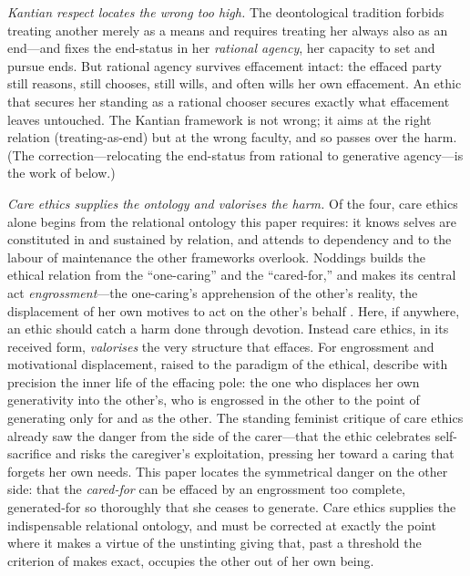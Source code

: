 \emph{Kantian respect locates the wrong too high.} The deontological tradition forbids treating another merely as a means and requires treating her always also as an end---and fixes the end-status in her \emph{rational agency}, her capacity to set and pursue ends. But rational agency survives effacement intact: the effaced party still reasons, still chooses, still wills, and often wills her own effacement. An ethic that secures her standing as a rational chooser secures exactly what effacement leaves untouched. The Kantian framework is not wrong; it aims at the right relation (treating-as-end) but at the wrong faculty, and so passes over the harm. (The correction---relocating the end-status from rational to generative agency---is the work of  below.)

\emph{Care ethics supplies the ontology and valorises the harm.} Of the four, care ethics alone begins from the relational ontology this paper requires: it knows selves are constituted in and sustained by relation, and attends to dependency and to the labour of maintenance the other frameworks overlook. Noddings builds the ethical relation from the ``one-caring'' and the ``cared-for,'' and makes its central act \emph{engrossment}---the one-caring's apprehension of the other's reality, the displacement of her own motives to act on the other's behalf \parencite{noddings1984}. Here, if anywhere, an ethic should catch a harm done through devotion. Instead care ethics, in its received form, \emph{valorises} the very structure that effaces. For engrossment and motivational displacement, raised to the paradigm of the ethical, describe with precision the inner life of the effacing pole: the one who displaces her own generativity into the other's, who is engrossed in the other to the point of generating only for and as the other. The standing feminist critique of care ethics already saw the danger from the side of the carer---that the ethic celebrates self-sacrifice and risks the caregiver's exploitation, pressing her toward a caring that forgets her own needs. This paper locates the symmetrical danger on the other side: that the \emph{cared-for} can be effaced by an engrossment too complete, generated-for so thoroughly that she ceases to generate. Care ethics supplies the indispensable relational ontology, and must be corrected at exactly the point where it makes a virtue of the unstinting giving that, past a threshold the criterion of  makes exact, occupies the other out of her own being.

